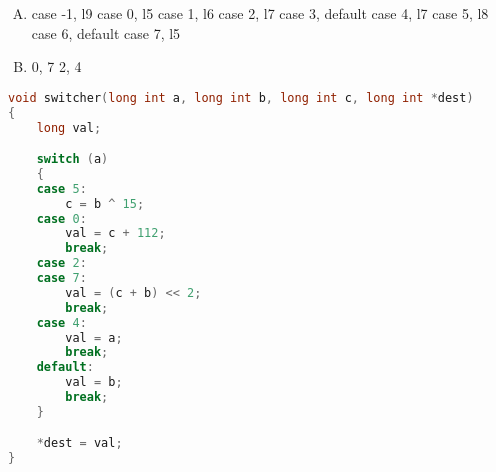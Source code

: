 {{        %
        \begin{practicec}
            \begin{enumerate}[A.]
                \item
                {
                    case -1, l9
                    case 0, l5
                    case 1, l6
                    case 2, l7
                    case 3, default
                    case 4, l7
                    case 5, l8
                    case 6, default
                    case 7, l5
                }
                \item
                {
                    0, 7
                }
                {
                    2, 4
                }
            \end{enumerate}
        \end{practicec}

        \begin{practicec}
            \begin{lstlisting}[language=C]
void switcher(long int a, long int b, long int c, long int *dest)
{
    long val;

    switch (a)
    {
    case 5:
        c = b ^ 15;
    case 0:
        val = c + 112;
        break;
    case 2:
    case 7:
        val = (c + b) << 2;
        break;
    case 4:
        val = a;
        break;
    default:
        val = b;
        break;
    }

    *dest = val;
}
            \end{lstlisting}
        \end{practicec}
    }
}

